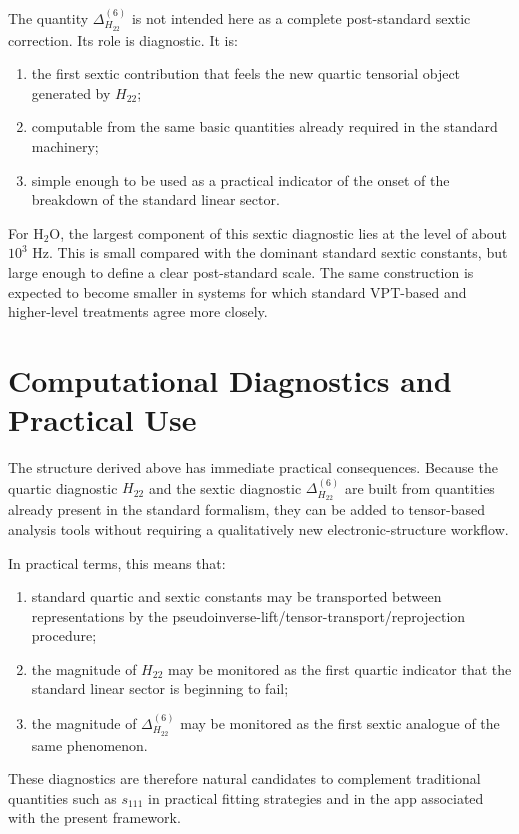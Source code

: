 The quantity $\Delta^{(6)}_{H_{22}}$ is not intended here as a complete
post-standard sextic correction. Its role is diagnostic. It is:
\begin{enumerate}
\item the first sextic contribution that feels the new quartic tensorial object
generated by $H_{22}$;
\item computable from the same basic quantities already required in the
standard machinery;
\item simple enough to be used as a practical indicator of the onset of the
breakdown of the standard linear sector.
\end{enumerate}

For H$_2$O, the largest component of this sextic diagnostic lies at the level
of about $10^3$ Hz. This is small compared with the dominant standard sextic
constants, but large enough to define a clear post-standard scale. The same
construction is expected to become smaller in systems for which standard
VPT-based and higher-level treatments agree more closely.

\section{Computational Diagnostics and Practical Use}

The structure derived above has immediate practical consequences. Because the
quartic diagnostic $H_{22}$ and the sextic diagnostic
$\Delta^{(6)}_{H_{22}}$ are built from quantities already present in the
standard formalism, they can be added to tensor-based analysis tools without
requiring a qualitatively new electronic-structure workflow.

In practical terms, this means that:
\begin{enumerate}
\item standard quartic and sextic constants may be transported between
representations by the pseudoinverse-lift/tensor-transport/reprojection
procedure;
\item the magnitude of $H_{22}$ may be monitored as the first quartic indicator
that the standard linear sector is beginning to fail;
\item the magnitude of $\Delta^{(6)}_{H_{22}}$ may be monitored as the first
sextic analogue of the same phenomenon.
\end{enumerate}
These diagnostics are therefore natural candidates to complement traditional
quantities such as $s_{111}$ in practical fitting strategies and in the app
associated with the present framework.
